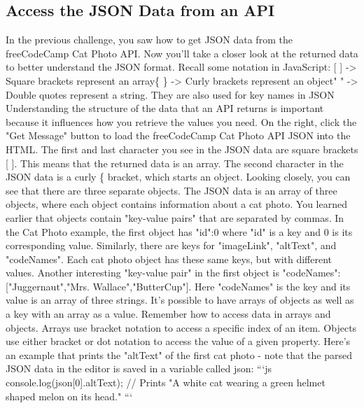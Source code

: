 \documentclass{article}%
\begin{document}
\subsection{Access the JSON Data from an API}%
\label{subsec:AccesstheJSONDatafromanAPI}%
In the previous challenge, you saw how to get JSON data from the freeCodeCamp Cat Photo API.\newline%
Now you'll take a closer look at the returned data to better understand the JSON format. Recall some notation in JavaScript:\newline%
{[} {]} {-}> Square brackets represent an array\{ \} {-}> Curly brackets represent an object" " {-}> Double quotes represent a string. They are also used for key names in JSON\newline%
Understanding the structure of the data that an API returns is important because it influences how you retrieve the values you need.\newline%
On the right, click the "Get Message" button to load the freeCodeCamp Cat Photo API JSON into the HTML.\newline%
The first and last character you see in the JSON data are square brackets {[} {]}. This means that the returned data is an array. The second character in the JSON data is a curly \{ bracket, which starts an object. Looking closely, you can see that there are three separate objects. The JSON data is an array of three objects, where each object contains information about a cat photo.\newline%
You learned earlier that objects contain "key{-}value pairs" that are separated by commas. In the Cat Photo example, the first object has "id":0 where "id" is a key and 0 is its corresponding value. Similarly, there are keys for "imageLink", "altText", and "codeNames". Each cat photo object has these same keys, but with different values.\newline%
Another interesting "key{-}value pair" in the first object is "codeNames":{[}"Juggernaut","Mrs. Wallace","ButterCup"{]}. Here "codeNames" is the key and its value is an array of three strings. It's possible to have arrays of objects as well as a key with an array as a value.\newline%
Remember how to access data in arrays and objects. Arrays use bracket notation to access a specific index of an item. Objects use either bracket or dot notation to access the value of a given property. Here's an example that prints the "altText" of the first cat photo {-} note that the parsed JSON data in the editor is saved in a variable called json:\newline%
```js\newline%
console.log(json{[}0{]}.altText);\newline%
// Prints "A white cat wearing a green helmet shaped melon on its head."\newline%
```\newline%
\end{document}

